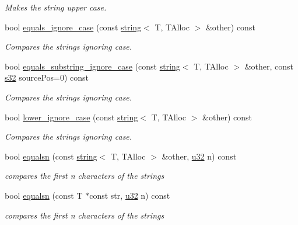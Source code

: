 \begin{DoxyCompactItemize}
\begin{DoxyCompactList}\small\item\em Makes the string upper case. \end{DoxyCompactList}\item 
bool \hyperlink{classirr_1_1core_1_1string_a17f9d297925378d71b5d6abaa42ed856}{equals\+\_\+ignore\+\_\+case} (const \hyperlink{classirr_1_1core_1_1string}{string}$<$ T, T\+Alloc $>$ \&other) const 
\begin{DoxyCompactList}\small\item\em Compares the strings ignoring case. \end{DoxyCompactList}\item 
bool \hyperlink{classirr_1_1core_1_1string_adf74d5a6ce1a2ed79b4b06d51e899602}{equals\+\_\+substring\+\_\+ignore\+\_\+case} (const \hyperlink{classirr_1_1core_1_1string}{string}$<$ T, T\+Alloc $>$ \&other, const \hyperlink{namespaceirr_ac66849b7a6ed16e30ebede579f9b47c6}{s32} source\+Pos=0) const 
\begin{DoxyCompactList}\small\item\em Compares the strings ignoring case. \end{DoxyCompactList}\item 
bool \hyperlink{classirr_1_1core_1_1string_a938dd424bfbae11187178aa1ddbf1aa8}{lower\+\_\+ignore\+\_\+case} (const \hyperlink{classirr_1_1core_1_1string}{string}$<$ T, T\+Alloc $>$ \&other) const 
\begin{DoxyCompactList}\small\item\em Compares the strings ignoring case. \end{DoxyCompactList}\item 
bool \hyperlink{classirr_1_1core_1_1string_a37c19857c3d44a88ae5a98e5be41b74f}{equalsn} (const \hyperlink{classirr_1_1core_1_1string}{string}$<$ T, T\+Alloc $>$ \&other, \hyperlink{namespaceirr_a0416a53257075833e7002efd0a18e804}{u32} n) const 
\begin{DoxyCompactList}\small\item\em compares the first n characters of the strings \end{DoxyCompactList}\item 
bool \hyperlink{classirr_1_1core_1_1string_a9ac31a89e05fc6381dfe1646ed4a0daa}{equalsn} (const T $\ast$const str, \hyperlink{namespaceirr_a0416a53257075833e7002efd0a18e804}{u32} n) const 
\begin{DoxyCompactList}\small\item\em compares the first n characters of the strings \end{DoxyCompactList}\item 

\end{DoxyCompactItemize}
